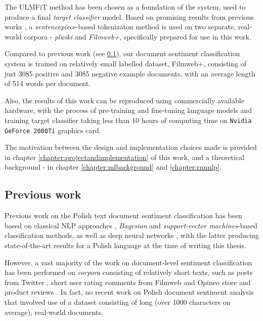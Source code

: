 The ULMFiT method has been chosen as a foundation of the system, used to produce a final \emph{target classifier} model. Based on promising results from previous works \cite{czaplakardas:ulmfit,poleval2019}, a \emph{sentencepiece}-based tokenizaton method is used on two separate, real-world corpora - \emph{plwiki} and \emph{Filmweb+}, specifically prepared for use in this work.

Compared to previous work (see \ref{previouswork}), our document sentiment classification system is trained on relatively small labelled dataset, Filmweb+, consisting of just 3085 positive and 3085 negative example documents, with an average length of 514 words per document.

Also, the results of this work can be reproduced using commercially available hardware, with the process of pre-training and fine-tuning language models and training target classifier taking less than 10 hours of computing time on \lstinline{Nvidia GeForce 2080Ti} graphics card.

The motivation between the design and implementation choices made is provided in chapter \ref{chapter:projectandimplementation} of this work, and a theoretical background - in chapter \ref{chapter:mlbackground} and \ref{chapter:rnnnlp}.

\subsection{Previous work}
\label{previouswork}

Previous work on the Polish text document sentiment classification has been based on classical NLP approaches \cite{buczynski:shallowclassicalnlp,wojcik:comparisonclassicnlp}, \emph{Bayesian} \cite{wiki:bayesian, chlasta:sentimenttwitter,polish:sentimentbayesian} and \emph{support-vector machines}-based \cite{wiki:svms,polish:sentimentsvms} classification methods, as well as deep neural networks \cite{czaplakardas:ulmfit,korzeniowski:poleval,wawer:polishsentimentshorttexts,poleval2019}, with the latter producing state-of-the-art results for a Polish language at the time of writing this thesis.

However, a vast majority of the work on document-level sentiment classification has been performed on \emph{corpora} consisting of relatively short texts, such as posts from Twitter \cite{poleval2019,korzeniowski:poleval,chlasta:sentimenttwitter}, short user rating comments from Filmweb \cite{wawer:polishsentimentshorttexts} and Opineo store and product reviews \cite{polish:sentimentsvms}. In fact, no recent work on Polish document sentiment analysis that involved use of a dataset consisting of long (over 1000 characters on average), real-world documents.

